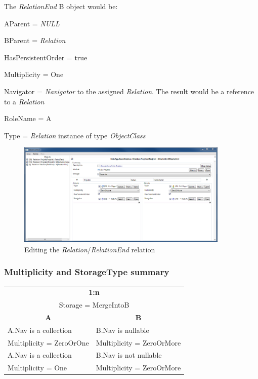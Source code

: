 The \emph{RelationEnd} B object would be:
\begin{descriptionBorder}
	\item[AParent] { =  \emph{NULL} }
	\item[BParent] { = \emph{Relation} }
	\item[HasPersistentOrder] { = true  }
	\item[Multiplicity] { = One }
	\item[Navigator] { = \emph{Navigator} to the assigned \emph{Relation}. The result would be a reference to a \emph{Relation}  }
	\item[RoleName] { = A }
	\item[Type] { = \emph{Relation} instance of type \emph{ObjectClass} }
\end{descriptionBorder}

\begin{figure}[ht]
	\begin{center}
		\includegraphics[width=0.9\textwidth]{images/ScreenShot_Rel_Project_ProjectMember.png}
		\caption{Editing the \emph{Relation}/\emph{RelationEnd} relation}
		\label{editing_relation_relationend_relation}
	\end{center}
\end{figure}

\subsubsection{Multiplicity and StorageType summary}

\begin{center}
	\begin{tabular}{|p{5cm}|p{5cm}|}
	\hline
		\multicolumn{2}{|c|}{\textbf{1:n}} \\ 
		\multicolumn{2}{|c|}{ Storage = MergeIntoB } \\
	\hline
		\multicolumn{1}{|c|}{\textbf{A}} & \multicolumn{1}{|c|}{\textbf{B}} \\
	\hline
		A.Nav is a collection & B.Nav is nullable \\
		Multiplicity = ZeroOrOne & Multiplicity = ZeroOrMore \\
	\hline
		A.Nav is a collection & B.Nav is not nullable\\
		Multiplicity = One  & Multiplicity = ZeroOrMore \\
	\hline
	\end{tabular}
\end{center}

